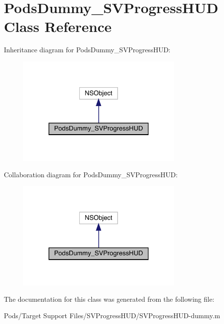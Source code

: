 \hypertarget{interface_pods_dummy___s_v_progress_h_u_d}{}\section{Pods\+Dummy\+\_\+\+S\+V\+Progress\+H\+UD Class Reference}
\label{interface_pods_dummy___s_v_progress_h_u_d}


Inheritance diagram for Pods\+Dummy\+\_\+\+S\+V\+Progress\+H\+UD\+:\nopagebreak
\begin{figure}[H]
\begin{center}
\leavevmode
\includegraphics[width=234pt]{interface_pods_dummy___s_v_progress_h_u_d__inherit__graph}
\end{center}
\end{figure}


Collaboration diagram for Pods\+Dummy\+\_\+\+S\+V\+Progress\+H\+UD\+:\nopagebreak
\begin{figure}[H]
\begin{center}
\leavevmode
\includegraphics[width=234pt]{interface_pods_dummy___s_v_progress_h_u_d__coll__graph}
\end{center}
\end{figure}


The documentation for this class was generated from the following file\+:\begin{DoxyCompactItemize}
\item 
Pods/\+Target Support Files/\+S\+V\+Progress\+H\+U\+D/S\+V\+Progress\+H\+U\+D-\/dummy.\+m\end{DoxyCompactItemize}
